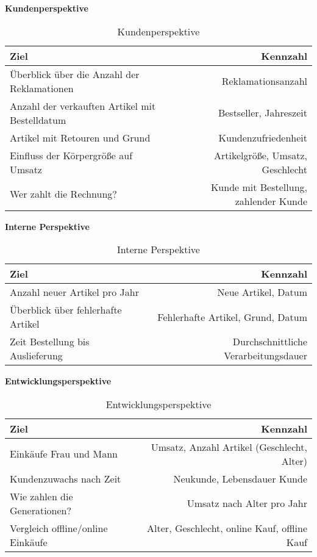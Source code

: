 \begin{table}[h]
\textbf{Kundenperspektive}
\begin{center}
  \begin{tabular}{ | l | r | }
    \hline
    \textbf{Ziel} & \textbf{Kennzahl} \\ \hline
    Überblick über die Anzahl der Reklamationen & Reklamationsanzahl \\ \hline
    Anzahl der verkauften Artikel mit Bestelldatum & Bestseller, Jahreszeit \\
    \hline
    Artikel mit Retouren und Grund  & Kundenzufriedenheit \\ \hline
    Einfluss der Körpergröße auf Umsatz & Artikelgröße, Umsatz, Geschlecht \\
    \hline
    Wer zahlt die Rechnung? & Kunde mit Bestellung, zahlender Kunde \\
    \hline
  \end{tabular}
\end{center}
\caption{Kundenperspektive}
\label{table:tableKunde}
\end{table}

\begin{table}[h]
\textbf{Interne Perspektive}
\begin{center}
  \begin{tabular}{ | l | r | }
    \hline
    \textbf{Ziel} & \textbf{Kennzahl} \\ \hline
    Anzahl neuer Artikel pro Jahr & Neue Artikel, Datum\\ \hline
    Überblick über fehlerhafte Artikel & Fehlerhafte Artikel, Grund, Datum \\
    \hline
    Zeit Bestellung bis Auslieferung  & Durchschnittliche Verarbeitungsdauer \\ \hline
  \end{tabular}
\end{center}
\caption{Interne Perspektive}
\label{table:tableIntern}
\end{table}

\begin{table}[h]
\textbf{Entwicklungsperspektive}
\begin{center}
  \begin{tabular}{ | l | r | }
    \hline
    \textbf{Ziel} & \textbf{Kennzahl} \\ \hline
    Einkäufe Frau und Mann & Umsatz, Anzahl Artikel (Geschlecht, Alter) \\ \hline
    Kundenzuwachs nach Zeit & Neukunde, Lebensdauer Kunde \\
    \hline
    Wie zahlen die Generationen? & Umsatz nach Alter pro Jahr \\ \hline
   Vergleich offline/online Einkäufe & Alter, Geschlecht, online Kauf, offline Kauf \\ \hline
  \end{tabular}
\end{center}
\caption{Entwicklungsperspektive}
\label{table:tableEntwicklung}
\end{table}

